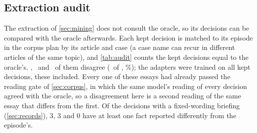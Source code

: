 \begin{table}[t]
\centering\footnotesize
\resizebox{\textwidth}{!}{}
\caption{For each trained adapter, on items of its own author's examination where the
compared author is determined and decides differently from the adapter's own author: how many
of its calls took its own author's decision, the compared author's decision, or neither (the
third option).}
\label{tab:cross}
\end{table}

\subsection{Extraction audit}\label{sec:audit}

The extraction of \cref{sec:mining} does not consult the oracle, so its decisions can be
compared with the oracle afterwards. Each kept decision is matched to its episode in the corpus
plan by its article and case (a case name can recur in different articles of the same topic),
and \cref{tab:audit} counts the kept decisions equal to the oracle's. \AuditDisagreeA,
\AuditDisagreeB\ and \AuditDisagreeC\ of them disagree (\AuditDisagreeAll\ of \AuditKeptAll,
\AuditDisagreeRateAll\%); the adapters were trained on all kept decisions, these included.
Every one of these essays had already passed the reading gate of \cref{sec:corpus}, in which
the same model's reading of every decision agreed with the oracle, so a disagreement here is a
second reading of the same essay that differs from the first. Of the decisions with a
fixed-wording briefing (\cref{sec:records}), 3, 3 and 0 have at least one fact reported
differently from the episode's.

\begin{table}[t]
\centering\small

\caption{Decisions read out of the essays compared with the oracle's decision for the same
episode.}
\label{tab:audit}
\end{table}

\begin{table}[t]
\centering\small
\resizebox{\textwidth}{!}{}
\caption{The corpora, each planned with 60 articles of three episodes. Words are
whitespace-separated tokens of the kept essays (mean per essay in parentheses; the shortest
essay has \CorpusMinWords\ words, the longest \CorpusMaxWords). Writing requests are the
requests for an essay; reading requests are the gate's readings of drafts that passed the
form gates. The rejection log has one line per writing request that did not keep an essay
(\cref{tab:rejections}). Essays mined are those whose decisions were read out
(\cref{sec:mining}); for author 101 one essay has no reading, so \CorpusACasesRead\ of its
168 cases were read. A decision yields three records, or six when it has a fixed-wording
briefing (\CorpusAFixedBriefings, \CorpusBFixedBriefings\ and \CorpusCFixedBriefings\
decisions).}
\label{tab:corpora}
\end{table}

